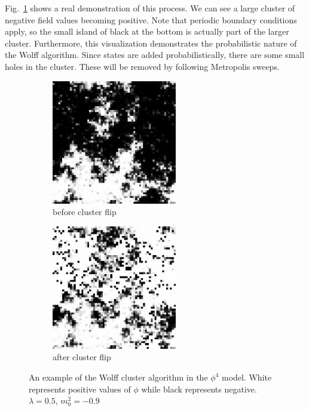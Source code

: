 Fig.~\ref{fig:wolff} shows a real demonstration of this process. We can see a large cluster of negative field values becoming positive. Note that periodic boundary conditions apply, so the small island of black at the bottom is actually part of the larger cluster. Furthermore, this visualization demonstrates the probabilistic nature of the Wolff algorithm. Since states are added probabilistically, there are some small holes in the cluster. These will be removed by following Metropolis sweeps.
\begin{figure}[h]
  \centering
      \begin{subfigure}[b]{0.5\textwidth}\centering
        \includegraphics[width=0.6\textwidth]{imgs/wolffa.png}
        \caption{before cluster flip}
      \end{subfigure}%
      \hfill
      \begin{subfigure}[b]{0.5\textwidth}\centering
        \includegraphics[width=0.6\textwidth]{imgs/wolffb.png}
        \caption{after cluster flip}
      \end{subfigure}
      \hfill
      \caption{\label{fig:wolff} An example of the Wolff cluster algorithm in the $\phi^4$ model. White represents positive values of $\phi$ while black represents negative. $\lambda=0.5$, $m_0^2=-0.9$}
  
\end{figure}

